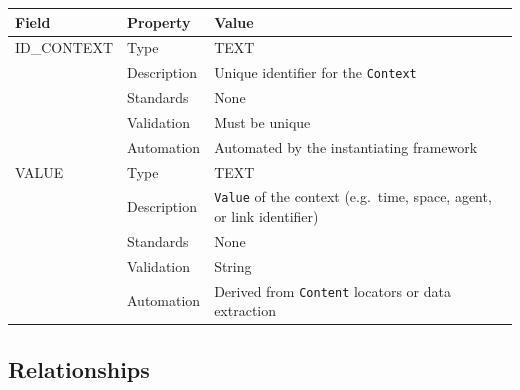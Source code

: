 \documentclass[
]{article}
\newcounter{none} %
\begin{document}
{\def\LTcaptype{none} %
\begin{longtable}[]{@{}
  >{\raggedright\arraybackslash}p{}
  >{\raggedright\arraybackslash}p{}
  >{\raggedright\arraybackslash}p{}@{}}
\toprule\noalign{}
\begin{minipage}[b]{\linewidth}\raggedright
Field
\end{minipage} & \begin{minipage}[b]{\linewidth}\raggedright
Property
\end{minipage} & \begin{minipage}[b]{\linewidth}\raggedright
Value
\end{minipage} \\
\midrule\noalign{}
\endhead
\bottomrule\noalign{}
\endlastfoot
ID\_CONTEXT & Type & TEXT \\
& Description & Unique identifier for the \texttt{Context} \\
& Standards & None \\
& Validation & Must be unique \\
& Automation & Automated by the instantiating framework \\
VALUE & Type & TEXT \\
& Description & \texttt{Value} of the context (e.g.~time, space, agent,
or link identifier) \\
& Standards & None \\
& Validation & String \\
& Automation & Derived from \texttt{Content} locators or data
extraction \\
\end{longtable}
}

\subsection{Relationships}\label{relationships-6}
\end{document}
